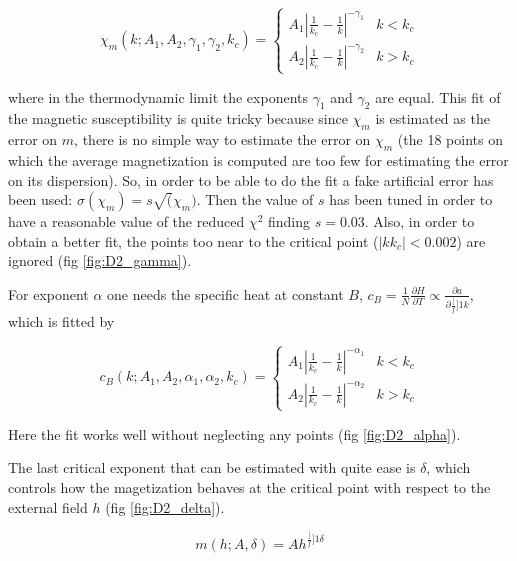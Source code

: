 \documentclass[a4paper, 11pt]{article}
\begin{document}
    \begin{equation}
      \chi_m(k;A_1,A_2,\gamma_1,\gamma_2,k_c) = \begin{cases}
        A_1 \left|\frac{1}{k_c} - \frac{1}{k} \right|^{-\gamma_1} & k < k_c \\
        A_2 \left|\frac{1}{k_c} - \frac{1}{k} \right|^{-\gamma_2} & k > k_c
      \end{cases}
    \end{equation}

    where in the thermodynamic limit the exponents $\gamma_1$ and $\gamma_2$ are equal. This fit of the magnetic susceptibility is quite tricky because since $\chi_m$ is estimated as the error on $m$, there is no simple way to estimate the error on $\chi_m$ (the 18 points on which the average magnetization is computed are too few for estimating the error on its dispersion). So, in order to be able to do the fit a fake artificial error has been used: $\sigma(\chi_m) = s\sqrt(\chi_m)$. Then the value of $s$ has been tuned in order to have a reasonable value of the reduced $\chi^2$ finding $s = 0.03$. Also, in order to obtain a better fit, the points too near to the critical point ($|k  k_c| < 0.002$) are ignored (fig \ref{fig:D2_gamma}).

    For exponent $\alpha$ one needs the specific heat at constant $B$, $c_B = \frac{1}{N}\frac{\partial H}{\partial T} \propto \frac{\partial a}{\partial \frac[f]{1}{k}}$, which is fitted by

    \begin{equation}
      c_B(k;A_1,A_2,\alpha_1,\alpha_2,k_c) = \begin{cases}
        A_1 \left|\frac{1}{k_c} - \frac{1}{k} \right|^{-\alpha_1} & k < k_c \\
        A_2 \left|\frac{1}{k_c} - \frac{1}{k} \right|^{-\alpha_2} & k > k_c
      \end{cases}
    \end{equation}

    Here the fit works well without neglecting any points (fig \ref{fig:D2_alpha}).

    The last critical exponent that can be estimated with quite ease is $\delta$, which controls how the magetization behaves at the critical point with respect to the external field $h$ (fig \ref{fig:D2_delta}).

    \begin{equation}
      m(h;A,\delta) = Ah^{\frac[f]{1}{\delta}}
    \end{equation}
\end{document}
